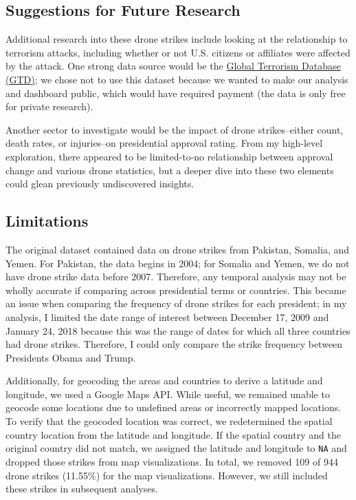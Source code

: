 \documentclass[
]{article}
\begin{document}
\hypertarget{suggestions-for-future-research}{%
\subsection{Suggestions for Future
Research}\label{suggestions-for-future-research}}

Additional research into these drone strikes include looking at the
relationship to terrorism attacks, including whether or not U.S.
citizens or affiliates were affected by the attack. One strong data
source would be the \href{https://start.umd.edu/gtd/}{Global Terrorism
Database (GTD)}; we chose not to use this dataset because we wanted to
make our analysis and dashboard public, which would have required
payment (the data is only free for private research).

Another sector to investigate would be the impact of drone
strikes--either count, death rates, or injuries--on presidential
approval rating. From my high-level exploration, there appeared to be
limited-to-no relationship between approval change and various drone
statistics, but a deeper dive into these two elements could glean
previously undiscovered insights.

\hypertarget{limitations}{%
\subsection{Limitations}\label{limitations}}

The original dataset contained data on drone strikes from Pakistan,
Somalia, and Yemen. For Pakistan, the data begins in 2004; for Somalia
and Yemen, we do not have drone strike data before 2007. Therefore, any
temporal analysis may not be wholly accurate if comparing across
presidential terms or countries. This became an issue when comparing the
frequency of drone strikes for each president; in my analysis, I limited
the date range of interest between December 17, 2009 and January 24,
2018 because this was the range of dates for which all three countries
had drone strikes. Therefore, I could only compare the strike frequency
between Presidents Obama and Trump.

Additionally, for geocoding the areas and countries to derive a latitude
and longitude, we used a Google Maps API. While useful, we remained
unable to geocode some locations due to undefined areas or incorrectly
mapped locations. To verify that the geocoded location was correct, we
redetermined the spatial country location from the latitude and
longitude. If the spatial country and the original country did not
match, we assigned the latitude and longitude to \texttt{NA} and dropped
those strikes from map visualizations. In total, we removed 109 of 944
drone strikes (11.55\%) for the map visualizations. However, we still
included these strikes in subsequent analyses.
\end{document}
